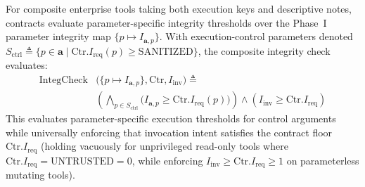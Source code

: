 \documentclass[conference,10pt]{IEEEtran}
\begin{document}
For composite enterprise tools taking both execution keys and descriptive notes, contracts evaluate parameter-specific integrity thresholds over the Phase~I parameter integrity map $\{p \mapsto I_{\mathbf{a}, p}\}$. With execution-control parameters denoted $S_{\text{ctrl}} \triangleq \{p \in \mathbf{a} \mid \text{Ctr}.I_{\text{req}}(p) \ge \text{SANITIZED}\}$, the composite integrity check evaluates:
\begin{equation}
\label{eq:integ_check}
\begin{split}
\text{IntegCheck}&\big(\{p \mapsto I_{\mathbf{a}, p}\}, \text{Ctr}, I_{\text{inv}}\big) \triangleq \\
&\left( \bigwedge_{p \in S_{\text{ctrl}}} \big( I_{\mathbf{a}, p} \ge \text{Ctr}.I_{\text{req}}(p) \big) \right) \land (I_{\text{inv}} \ge \text{Ctr}.I_{\text{req}})
\end{split}
\end{equation}
This evaluates parameter-specific execution thresholds for control arguments while universally enforcing that invocation intent satisfies the contract floor $\text{Ctr}.I_{\text{req}}$ (holding vacuously for unprivileged read-only tools where $\text{Ctr}.I_{\text{req}} = \text{UNTRUSTED} = 0$, while enforcing $I_{\text{inv}} \ge \text{Ctr}.I_{\text{req}} \ge 1$ on parameterless mutating tools).
\end{document}

